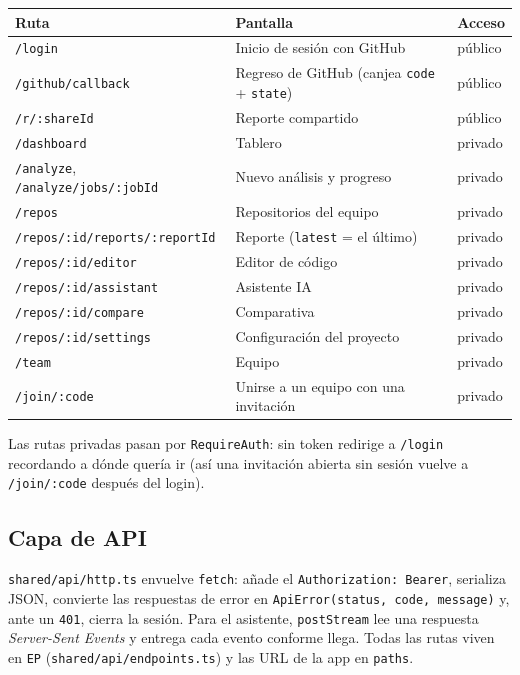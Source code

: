 \documentclass[11pt,a4paper]{article}
\newcommand{\code}[1]{\texttt{\small #1}}
\newcommand{\ruta}[1]{\texttt{\small\color{branddark}#1}}
\begin{document}
\begin{center}
\begin{tabularx}{\linewidth}{@{}lLl@{}}
\toprule
\textbf{Ruta} & \textbf{Pantalla} & \textbf{Acceso} \\
\midrule
\ruta{/login} & Inicio de sesión con GitHub & público \\
\ruta{/github/callback} & Regreso de GitHub (canjea \code{code} + \code{state}) & público \\
\ruta{/r/:shareId} & Reporte compartido & público \\
\ruta{/dashboard} & Tablero & privado \\
\ruta{/analyze}, \ruta{/analyze/jobs/:jobId} & Nuevo análisis y progreso & privado \\
\ruta{/repos} & Repositorios del equipo & privado \\
\ruta{/repos/:id/reports/:reportId} & Reporte (\code{latest} = el último) & privado \\
\ruta{/repos/:id/editor} & Editor de código & privado \\
\ruta{/repos/:id/assistant} & Asistente IA & privado \\
\ruta{/repos/:id/compare} & Comparativa & privado \\
\ruta{/repos/:id/settings} & Configuración del proyecto & privado \\
\ruta{/team} & Equipo & privado \\
\ruta{/join/:code} & Unirse a un equipo con una invitación & privado \\
\bottomrule
\end{tabularx}
\end{center}

Las rutas privadas pasan por \code{RequireAuth}: sin token redirige a \ruta{/login} recordando a dónde quería ir (así
una invitación abierta sin sesión vuelve a \ruta{/join/:code} después del login).

\subsection{Capa de API}

\ruta{shared/api/http.ts} envuelve \code{fetch}: añade el \code{Authorization: Bearer}, serializa JSON, convierte las
respuestas de error en \code{ApiError(status, code, message)} y, ante un \code{401}, cierra la sesión. Para el asistente,
\code{postStream} lee una respuesta \emph{Server-Sent Events} y entrega cada evento conforme llega. Todas las rutas
viven en \code{EP} (\ruta{shared/api/endpoints.ts}) y las URL de la app en \code{paths}.
\end{document}
